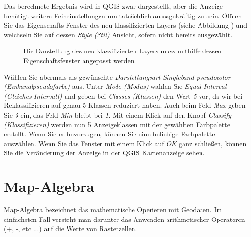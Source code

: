 \documentclass[a4paper,12pt,ngerman]{sphinxmanual}
\begin{document}
Das berechnete Ergebnis wird in QGIS zwar dargestellt, aber die Anzeige benötigt weitere Feineinstellungen um tatsächlich aussagekräftig zu sein.
Öffnen Sie das Eigenschafts Fenster des neu klassifizierten Layers (siehe Abbildung ) und welchseln Sie auf dessen \emph{Style (Stil)} Ansicht, sofern nicht bereits ausgewählt.
\begin{figure}[htbp]
\centering
\capstart

\caption{Die Darstellung des neu klassifizierten Layers muss mithilfe dessen Eigenschaftsfenster angepasst werden.}\label{uebung3:figrecode-reclass}\end{figure}

Wählen Sie abermals als gewünschte \emph{Darstellungsart} \emph{Singleband pseudocolor (Einkanalpseudofarbe)} aus. Unter \emph{Mode (Modus)} wählen Sie \emph{Equal Interval (Gleiches Intervall)} und geben bei \emph{Classes (Klassen)} den Wert \emph{5} vor, da wir bei Reklassifizieren auf genau 5 Klassen reduziert haben. Auch beim Feld \emph{Max} geben Sie \emph{5} ein, das Feld \emph{Min} bleibt bei \emph{1}.
Mit einem Klick auf den Knopf \emph{Classify (Klassifizieren)} werden nun 5 Anzeigeklassen mit der gewählten Farbpalette erstellt. Wenn Sie es bevorzugen, können Sie eine beliebige Farbpalette auswählen.
Wenn Sie das Fenster mit einem Klick auf \emph{OK} ganz schließen, können Sie die Veränderung der Anzeige in der QGIS Kartenanzeige sehen.


\section{Map-Algebra}
\label{uebung3:map-algebra}
Map-Algebra bezeichnet das mathematische Operieren mit Geodaten. Im einfachsten Fall versteht man darunter das Anwenden arithmetischer Operatoren (+, -, etc ...) auf die Werte von Rasterzellen.
\end{document}

